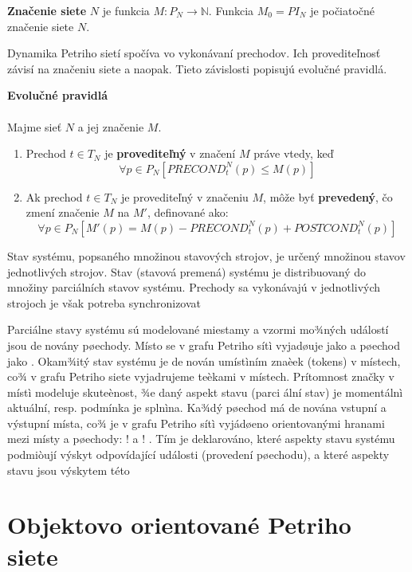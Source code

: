 \begin{defn}
	\textbf{Značenie siete} $N$ je funkcia $M : P_N \longrightarrow \mathbb{N}$. Funkcia $M_0 = PI_N$ je počiatočné značenie siete $N$.
	
\end{defn}

	Dynamika Petriho sietí spočíva vo vykonávaní prechodov. Ich provediteľnosť závisí na značeniu siete a naopak. Tieto závislosti popisujú evolučné pravidlá.
	
\begin{defn}
	\textbf{Evolučné pravidlá} \\\\ Majme sieť $N$ a jej značenie $M$.
	\begin{enumerate}
		\item Prechod $t \in T_N$ je \textbf{provediteľný} v značení $M$ práve vtedy, keď
		$$ \forall p \in P_N [PRECOND_t^N(p) \leq M(p) ]$$
		\item Ak prechod $t \in T_N$ je provediteľný v značeniu $M$, môže byť \textbf{prevedený}, čo zmení značenie $M$ na $M'$, definované ako:
		$$\forall p \in P_N [M'(p)=M(p) - PRECOND_t^N(p) + POSTCOND_t^N(p) ]$$ 
	\end{enumerate}
\end{defn}  



Stav systému, popsaného množinou stavových strojov, je určený množinou stavov jednotlivých strojov. Stav (stavová premená) systému je distribuovaný do množiny parciálních stavov systému. Prechody sa vykonávajú v jednotlivých strojoch je však potreba synchronizovat

Parciálne stavy systému sú modelované miestamy a vzormi mo¾ných událostí jsou denovány
pøechody. Místo se v grafu Petriho sítì vyjadøuje jako 
 a pøechod jako . Okam¾itý stav
systému je denován umístìním znaèek (tokens) v místech, co¾ v grafu Petriho siete vyjadrujeme
teèkami v místech. Prítomnost značky v místì modeluje skuteènost, ¾e daný aspekt stavu (parci
ální stav) je momentálnì aktuální, resp. podmínka je splnìna. Ka¾dý pøechod má denována
vstupní a výstupní místa, co¾ je v grafu Petriho sítì vyjádøeno orientovanými hranami mezi
místy a pøechody: 
! a !
. Tím je deklarováno, které aspekty stavu systému podmiòují
výskyt odpovídající události (provedení pøechodu), a které aspekty stavu jsou výskytem této

\section{Objektovo orientované Petriho siete}

